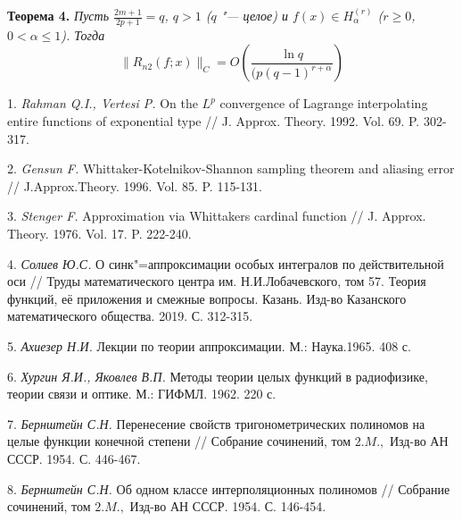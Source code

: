 \textbf{Теорема 4.} {\it Пусть $\frac{2m+1}{2p+1}=q$, $q > 1$ ($q$ "--- целое) и $f(x) \in H_{\alpha}^{(r)}$ ($r \geqslant 0$, $0< \alpha \leqslant 1$). Тогда}
$$ \|R_{n2}(f;x)\|_C = O\left(\frac{\ln{q}}{(p(q-1)^{r+\alpha}}\right)$$


\litlist

1. {\it Rahman Q.I., Vertesi P.} On the $L^p$ convergence of  Lagrange interpolating entire functions of exponential type // J. Approx. Theory. 1992. Vol. 69. P. 302-317.

2. {\it Gensun F.} Whittaker-Kotelnikov-Shannon sampling theorem and aliasing error // J.Approx.Theory. 1996. Vol. 85. P. 115-131.

3. {\it Stenger F.} Approximation via Whittakers cardinal function // J. Approx. Theory. 1976. Vol. 17. P. 222-240.


4. {\it Солиев Ю.С.} О синк"=аппроксимации особых интегралов по действительной оси // Труды математического центра им. Н.И.Лобачевского, том 57. Теория функций, её приложения и смежные вопросы. Казань. Изд-во Казанского математического общества. 2019. С. 312-315.

5. {\it Ахиезер Н.И.} Лекции по теории аппроксимации. М.: Наука.1965. 408 с.

6. {\it Хургин Я.И., Яковлев В.П.} Методы теории целых функций в радиофизике, теории связи и оптике. М.: ГИФМЛ. 1962. 220 с.

7. {\it Бернштейн С.Н.} Перенесение свойств тригонометрических полиномов на целые функции конечной степени // Собрание сочинений, том $2. M.,$ Изд-во АН СССР. 1954. С. 446-467.

8. {\it Бернштейн С.Н.} Об одном классе интерполяционных полиномов // Собрание сочинений, том $2. M.,$ Изд-во АН СССР. 1954. С. 146-454.
